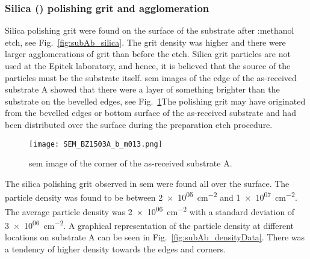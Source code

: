 \subsubsection{Silica () polishing grit and agglomeration}

Silica polishing grit were found on the surface of the substrate after :methanol etch, see Fig.~\ref{fig:subAb_silica}. The grit density was higher and there were larger agglomerations of grit than before the etch. Silica grit particles are not used at the Epitek laboratory, and hence, it is believed that the source of the particles must be the substrate itself. \Ac{sem} images of the edge of the as-received substrate A showed that there were a layer of something brighter than the substrate on the bevelled edges, see Fig.~\ref{fig:subAa_corner_w_grit}The polishing grit may have originated from the bevelled edges or bottom surface of the as-received substrate and had been distributed over the surface during the preparation etch procedure.

\begin{figure}[htbp]
    \centering
    \texttt{[image: SEM\_BZ1503A\_b\_m013.png]}
    \caption{\Ac{sem} image of the corner of the as-received substrate A.}
    \label{fig:subAa_corner_w_grit}
\end{figure}


The silica polishing grit observed in \ac{sem} were found all over the surface. The particle density was found to be between \SI{2e+05}{\centi\metre^{-2}} and \SI{1e+07}{\centi\metre^{-2}}. The average particle density was \SI{2e+06}{\centi\metre^{-2}} with a standard deviation of \SI{3e+06}{\centi\metre^{-2}}. A graphical representation of the particle density at different locations on substrate A can be seen in Fig.~\ref{fig:subAb_densityData}. There was a tendency of higher density towards the edges and corners.

